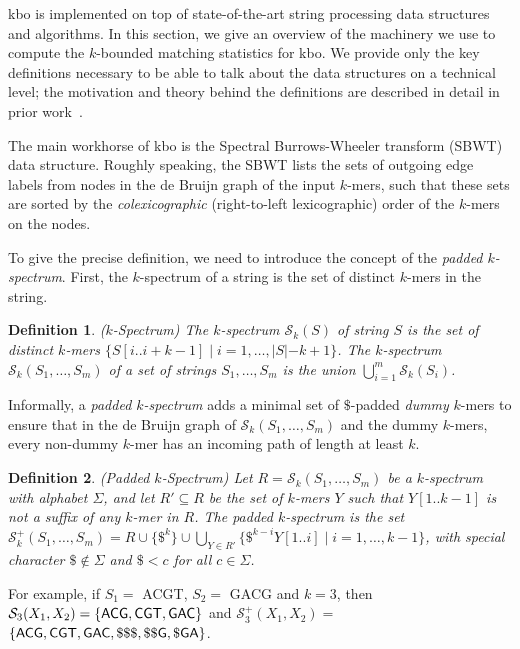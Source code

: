 \documentclass[unnumsec,webpdf,contemporary,large]{oup-authoring-template}%
\theoremstyle{thmstyleone}%
\theoremstyle{thmstyletwo}%
\theoremstyle{thmstylethree}%
\newtheorem{definition}{Definition}
\begin{document}
{\sf kbo} is implemented on top of state-of-the-art string processing data structures and algorithms. In this section, we give an overview of the machinery we use to compute the $k$-bounded matching statistics for {\sf kbo}. We provide only the key definitions necessary to be able to talk about the data structures on a technical level; the motivation and theory behind the definitions are described in detail in prior work~\cite{alanko2023longest, alanko2024finimizers, alanko2023small}.




The main workhorse of {\sf kbo} is the Spectral Burrows-Wheeler transform (SBWT) data structure. Roughly speaking, the SBWT lists the sets of outgoing edge labels from nodes in the de Bruijn graph of the input $k$-mers, such that these sets are sorted by the \emph{colexicographic} (right-to-left lexicographic) order of the $k$-mers on the nodes.

To give the precise definition, we need to introduce the concept of the \emph{padded $k$-spectrum}. First, the $k$-spectrum of a string is the set of distinct $k$-mers in the string.

\begin{definition}($k$-Spectrum) The $k$-spectrum $\mathcal{S}_k(S)$ of string $S$ is the set of distinct $k$-mers $\{S[i..i+k-1] \; | \; i = 1 , \ldots, |S|-k+1\}$.
%
The $k$-spectrum $\mathcal{S}_k(S_1, \ldots, S_m)$ of a set of strings $S_1, \ldots, S_m$ is the union $\bigcup_{i = 1}^m \mathcal{S}_k(S_i)$.
\end{definition}

\noindent Informally, a \emph{padded $k$-spectrum} adds a minimal set of $\$$-padded \emph{dummy} $k$-mers to ensure that in the de Bruijn graph of $\mathcal S_k(S_1, \ldots, S_m)$ and the dummy $k$-mers, every non-dummy $k$-mer has an incoming path of length at least $k$.

\begin{definition}\label{def:padded_k_spectrum} (Padded $k$-Spectrum)
Let $R = \mathcal{S}_k(S_1, \ldots, S_m)$ be a $k$-spectrum with alphabet $\Sigma$, and let $R' \subseteq R$ be the set of $k$-mers $Y$ such that $Y[1..k-1]$ is not a suffix of any $k$-mer in $R$. The padded $k$-spectrum is the set $\mathcal{S}_k^+(S_1, \ldots, S_m) = R \cup \{\$^k\} \cup \bigcup_{Y \in R'} \{\$^{k-i} Y[1..i] \; | \; i = 1, \ldots, k-1\}$, with special character $\$ \not\in \Sigma$ and $\$ < c$ for all $c \in \Sigma$.
\end{definition}
\noindent For example, if $S_1 = $ {\sf ACGT}, $S_2 = $ {\sf GACG} and $k=3$, then $\mathcal{S}_3(X_1, X_2) = \{ {\sf ACG }, {\sf CGT }, {\sf GAC }\}$ and $\mathcal{S}_3^+(X_1, X_2) = $ $\{{\sf ACG }, {\sf CGT}, {\sf GAC }, {\sf \$\$\$}, {\sf \$\$G}, {\sf \$GA} \}$.
\end{document}

